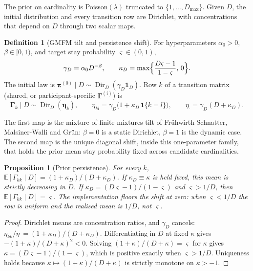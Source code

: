 \documentclass[11pt,a4paper]{article}
\DeclareMathOperator{\Dir}{Dir}
\newcommand{\bs}{\boldsymbol}
\newcommand{\E}{\mathbb{E}}
\newcommand{\bGamma}{\boldsymbol{\Gamma}}
\newcommand{\one}{\mathbf{1}}
\newcommand{\Dmax}{D_{\max}}
\newcommand{\gammaD}{\gamma_{D}}
\newcommand{\kapD}{\kappa_{D}}
\newcommand{\etadot}{\eta_{\boldsymbol{\cdot}}}
\newcommand{\indic}[1]{\mathbf{1}\{#1\}}
\theoremstyle{plain}
\newtheorem{proposition}{Proposition}
\theoremstyle{definition}
\newtheorem{definition}{Definition}
\theoremstyle{remark}
\begin{document}
The prior on cardinality is Poisson$(\lambda)$ truncated to
$\{1,\dots,\Dmax\}$. Given $D$, the initial distribution and every
transition row are Dirichlet, with concentrations that depend on $D$
through two scalar maps.

\begin{definition}[GMFM tilt and persistence shift]
\label{def:tilts}
For hyperparameters $\alpha_0>0$, $\beta\in[0,1)$, and target stay
probability $\varsigma\in(0,1)$,
\begin{equation}
\gammaD=\alpha_0 D^{-\beta},
\qquad
\kapD=\max\Bigl\{\frac{D\varsigma-1}{1-\varsigma},\,0\Bigr\}.
\label{eq:tilts}
\end{equation}
The initial law is $\bs\pi^{(0)}\mid D\sim\Dir_D(\gammaD\one_D)$. Row $k$
of a transition matrix (shared, or participant-specific $\bGamma^{(i)}$)
is
\begin{equation}
\bGamma_k\mid D\sim\Dir_D(\bs\eta_k),
\qquad
\eta_{kl}=\gammaD\bigl(1+\kapD\,\indic{k=l}\bigr),
\qquad
\etadot=\gammaD(D+\kapD).
\label{eq:eta}
\end{equation}
\end{definition}

The first map is the mixture-of-finite-mixtures tilt of
Fr\"uhwirth-Schnatter, Malsiner-Walli and Gr\"un: $\beta=0$ is a static
Dirichlet, $\beta=1$ is the dynamic case. The second map is the unique
diagonal shift, inside this one-parameter family, that holds the prior mean
stay probability fixed across candidate cardinalities.

\begin{proposition}[Prior persistence]
\label{prop:stay}
For every $k$,
$\E[\Gamma_{kk}\mid D]=(1+\kapD)/(D+\kapD)$.
If $\kapD\equiv\kappa$ is held fixed, this mean is strictly decreasing in
$D$. If $\kapD=(D\varsigma-1)/(1-\varsigma)$ and $\varsigma>1/D$, then
$\E[\Gamma_{kk}\mid D]=\varsigma$. The implementation floors the shift at
zero: when $\varsigma<1/D$ the row is uniform and the realised mean is
$1/D$, not $\varsigma$.
\end{proposition}

\begin{proof}
Dirichlet means are concentration ratios, and $\gammaD$ cancels:
$\eta_{kk}/\etadot=(1+\kapD)/(D+\kapD)$. Differentiating in $D$ at fixed
$\kappa$ gives $-(1+\kappa)/(D+\kappa)^2<0$. Solving
$(1+\kappa)/(D+\kappa)=\varsigma$ for $\kappa$ gives
$\kappa=(D\varsigma-1)/(1-\varsigma)$, which is positive exactly when
$\varsigma>1/D$. Uniqueness holds because
$\kappa\mapsto(1+\kappa)/(D+\kappa)$ is strictly monotone on $\kappa>-1$.
\end{proof}
\end{document}
